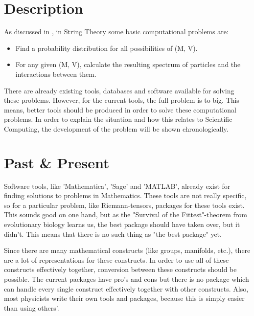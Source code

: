 \documentclass[../paper.tex]{subfiles}
\begin{document}
\section*{Description}
As discussed in \citep{ComputationalExploration}, in String Theory some basic computational problems are:
\begin{itemize}
    \item Find a probability distribution for all possibilities of (M, V).
    \item For any given (M, V), calculate the resulting spectrum of particles and the interactions between them.
\end{itemize}


There are already existing tools, databases and software available for solving these problems. However, for the current tools, the full problem is to big. This means, better tools should be produced in order to solve these computational problems. In order to explain the situation and how this relates to Scientific Computing, the development of the problem will be shown chronologically.


\section*{Past \& Present}
Software tools, like 'Mathematica', 'Sage' and 'MATLAB', already exist for finding solutions to problems in Mathematics. These tools are not really specific, so for a particular problem, like Riemann-tensors, packages for these tools exist. This sounds good on one hand, but as the "Survival of the Fittest"-theorem from evolutionary biology learns us, the best package should have taken over, but it didn't. This means that there is no such thing as "the best package" yet. 

Since there are many mathematical constructs (like groups, manifolds, etc.), there are a lot of representations for these constructs. In order to use all of these constructs effectively together, conversion between these constructs should be possible. The current packages have pro's and cons but there is no package which can handle every single construct effectively together with other constructs. Also, most physicists write their own tools and packages, because this is simply easier than using others'. 
\end{document}
